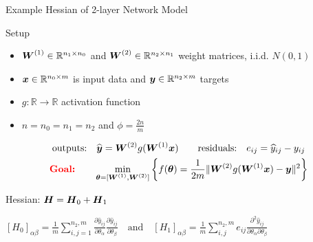 \documentclass[10pt]{beamer}
\begin{document}
\begin{frame}{Example Hessian of 2-layer Network Model}
\begin{alertblock}{Setup}
\begin{itemize}
    \item ${\boldsymbol W}^{(1)} \in \mathbb{R}^{n_1 \times n_0}$ and ${\boldsymbol W}^{(2)} \in \mathbb{R}^{n_2 \times n_1}$ weight matrices, i.i.d. $N(0,1)$
    \item ${\boldsymbol x} \in \mathbb{R}^{n_0 \times m}$ is input data and ${\boldsymbol y} \in \mathbb{R}^{n_2 \times m}$ targets
    \item $g : \mathbb{R} \to \mathbb{R}$ activation function
    \item $n = n_0 = n_1 = n_2$ and $\phi = \frac{2n}{m}$
\end{itemize}
\begin{equation*} \begin{gathered}
\text{outputs:} \quad \widehat{{\boldsymbol y}} = {\boldsymbol W}^{(2)} g ({\boldsymbol W}^{(1)} {\boldsymbol x}) \qquad \text{residuals:} \quad e_{ij} = \widehat{y}_{ij} - y_{ij}\\
\textbf{\textcolor{red}{Goal:}} \qquad \min_{{\boldsymbol \theta} = [{\boldsymbol W}^{(1)}, {\boldsymbol W}^{(2)}]} \left \{ f({\boldsymbol \theta}) = \frac{1}{2m} \|{\boldsymbol W}^{(2)} g({\boldsymbol W}^{(1)} {\boldsymbol x}) - {\boldsymbol y}\|^2 \right \}
\end{gathered} \end{equation*}
\end{alertblock}
\pause 
\begin{exampleblock}{Hessian: \quad ${\boldsymbol H} = {\boldsymbol H}_0 + {\boldsymbol H}_1$}
\begin{center}
    $\displaystyle [H_0]_{\alpha \beta} = \frac{1}{m} \sum_{i,j=1}^{n_2,m} \frac{\partial \hat{y}_{ij}}{\partial \theta_\alpha} \frac{\partial \hat{y}_{ij}}{\partial \theta_\beta}  \quad \text{and} \quad [H_1]_{\alpha \beta} = \frac{1}{m} \sum_{i,j}^{n_2,m} e_{ij} \frac{\partial^2 \hat{y}_{ij}}{\partial \theta_{\alpha} \partial \theta_{\beta}}$ 
\end{center}
\end{exampleblock}
\end{frame}
\end{document}
